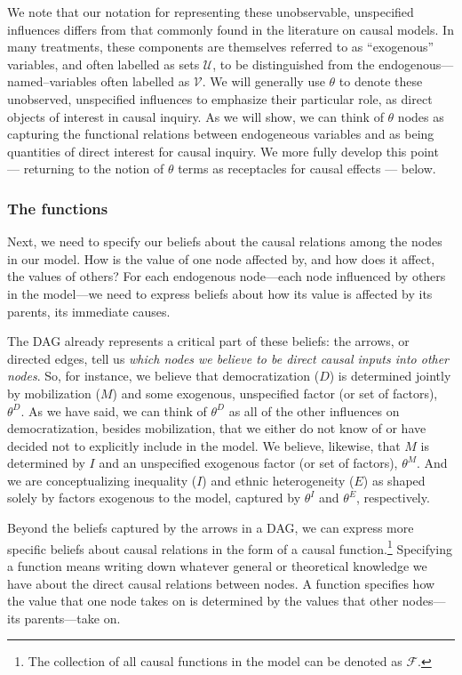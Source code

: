 \documentclass[
  12pt,
]{book}
\begin{document}
We note that our notation for representing these unobservable, unspecified influences differs from that commonly found in the literature on causal models. In many treatments, these components are themselves referred to as ``exogenous'' variables, and often labelled as sets \(\mathcal U\), to be distinguished from the endogenous---named--variables often labelled as \(\mathcal V\). We will generally use \(\theta\) to denote these unobserved, unspecified influences to emphasize their particular role, as direct objects of interest in causal inquiry. As we will show, we can think of \(\theta\) nodes as capturing the functional relations between endogeneous variables and as being quantities of direct interest for causal inquiry. We more fully develop this point --- returning to the notion of \(\theta\) terms as receptacles for causal effects --- below.

\hypertarget{the-functions}{%
\subsubsection{The functions}\label{the-functions}}

Next, we need to specify our beliefs about the causal relations among the nodes in our model. How is the value of one node affected by, and how does it affect, the values of others? For each endogenous node---each node influenced by others in the model---we need to express beliefs about how its value is affected by its parents, its immediate causes.

The DAG already represents a critical part of these beliefs: the arrows, or directed edges, tell us \emph{which nodes we believe to be direct causal inputs into other nodes}. So, for instance, we believe that democratization (\(D\)) is determined jointly by mobilization (\(M\)) and some exogenous, unspecified factor (or set of factors), \(\theta^D\). As we have said, we can think of \(\theta^D\) as all of the other influences on democratization, besides mobilization, that we either do not know of or have decided not to explicitly include in the model. We believe, likewise, that \(M\) is determined by \(I\) and an unspecified exogenous factor (or set of factors), \(\theta^M\). And we are conceptualizing inequality (\(I\)) and ethnic heterogeneity (\(E\)) as shaped solely by factors exogenous to the model, captured by \(\theta^I\) and \(\theta^E\), respectively.

Beyond the beliefs captured by the arrows in a DAG, we can express more specific beliefs about causal relations in the form of a causal function.\footnote{The collection of all causal functions in the model can be denoted as \(\mathcal{F}\).} Specifying a function means writing down whatever general or theoretical knowledge we have about the direct causal relations between nodes. A function specifies how the value that one node takes on is determined by the values that other nodes---its parents---take on.
\end{document}
